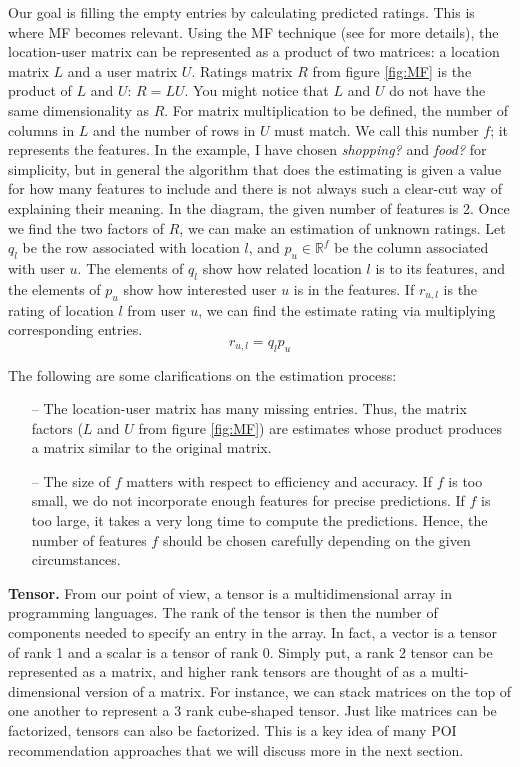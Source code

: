 \documentclass{sig-alternate}
\begin{document}
Our goal is filling the empty entries by calculating predicted ratings. This is where MF becomes
relevant. Using the MF technique (see \cite{Koren:2009} for more details), the location-user matrix can be represented as a product of two matrices: 
a location matrix $L$ and a user matrix $U$. Ratings matrix $R$ from figure \ref{fig:MF} is the product of $L$ and $U$:  $R = L U$. 
You might notice that $L$ and $U$ do not have the same dimensionality as $R$. For matrix multiplication to be defined, the number of columns in $L$ and the number of rows in $U$ must match.  
We call this number $f$; it represents the features. In the example, I have chosen  \emph{shopping?} and  \emph{food?} for simplicity, 
but in general the algorithm that does the estimating is given a value for how many features to include and there is not always such a clear-cut way of explaining their meaning. In the diagram, the given number of features is 2. Once we find the two 
factors of $R$, we can make an estimation of unknown ratings. Let $q_l$ be the row associated with location $l$, and 
$p_u \in \mathbb{R}^f$ be the column associated with user $u$. The elements of $q_l$ show how related location $l$ is to its features, 
and the elements of $p_u$ show how interested user $u$ is in the features. If $r_{u,l}$ is the rating of location $l$ 
from user $u$, we can find the estimate rating via multiplying corresponding entries. ~\cite{Koren:2009}
\begin{equation}
	r_{u,l}= q_l p_u
\label{eq:MF}
\end{equation}

The following are some clarifications on the estimation process:
\begin{itemize}
\item[--] The location-user matrix has many missing entries. Thus, the matrix factors ($L$ and $U$ from figure \ref{fig:MF}) are 
estimates whose product produces a matrix similar to the original matrix.
\item[--] The size of $f$ matters with respect to efficiency and accuracy. If $f$ is too small, we do not 
incorporate enough features for precise predictions. If $f$ is too large, it takes a very long time 
to compute the predictions. Hence, the number of features $f$ should be chosen carefully depending on 
the given circumstances.
\end{itemize}

\textbf{Tensor.} From our point of view, a tensor is a multidimensional array  in programming languages.  
The rank of the tensor is then the number of components needed to specify an entry in the array. 
In fact, a vector is a tensor of rank 1 and a scalar is a tensor 
of rank 0. Simply put, a rank 2 tensor can be represented as a matrix, and higher rank tensors 
are thought of as a multi-dimensional version of a matrix. For instance, we can stack matrices on 
the top of one another to represent a 3 rank cube-shaped tensor.
Just like matrices can be factorized, tensors can also be factorized. 
This is a key idea of many POI recommendation approaches 
that we will discuss more in the next section.
\end{document}
